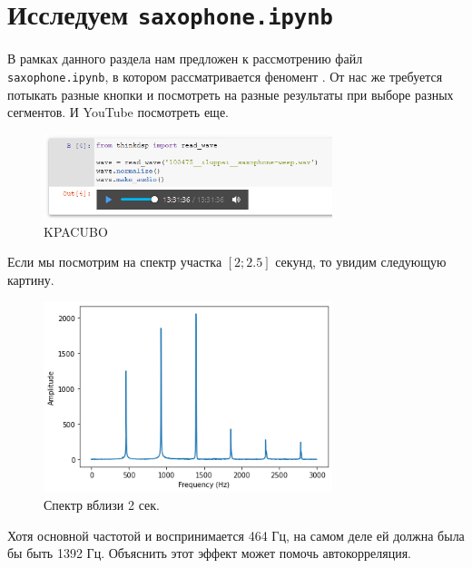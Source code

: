 \documentclass[a4paper,12pt]{report}
\begin{document}
    \chapter{Исследуем \texttt{saxophone.ipynb}}
    
    В рамках данного раздела нам предложен к рассмотрению файл \texttt{saxophone.ipynb}, в котором рассматривается феномент . От нас же требуется потыкать разные кнопки и посмотреть на разные результаты при выборе разных сегментов. И YouTube \cite{video} посмотреть еще.
    
    \begin{figure}[H]
        \centering
        \includegraphics[width=0.75\textwidth]{images/ex4_original.png}
        \caption{KPACUBO}
        \label{fig:ex4_original}
    \end{figure}
    
    Если мы посмотрим на спектр участка $[2;2.5]$ секунд, то увидим следующую картину.
    
    \begin{figure}[H]
        \centering
        \includegraphics[width=0.75\textwidth]{images/ex4_spectrum_2s.png}
        \caption{Спектр вблизи 2 сек.}
        \label{fig:ex4_spectrum_2s}
    \end{figure}
    
    Хотя основной частотой и воспринимается 464 Гц, на самом деле ей должна была бы быть 1392 Гц. Объяснить этот эффект может помочь автокорреляция.
    
\end{document}
